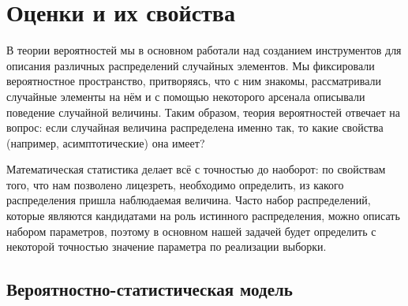 \section{Оценки и их свойства}

В теории вероятностей мы в основном работали над созданием инструментов для описания различных распределений случайных элементов. Мы фиксировали вероятностное пространство, притворяясь, что с ним знакомы, рассматривали случайные элементы на нём и с помощью некоторого арсенала описывали поведение случайной величины. Таким образом, теория вероятностей отвечает на вопрос: если случайная величина распределена именно так, то какие свойства (например, асимптотические) она имеет?

Математическая статистика делает всё с точностью до наоборот: по свойствам того, что нам позволено лицезреть, необходимо определить, из какого распределения пришла наблюдаемая величина. Часто набор распределений, которые являются кандидатами на роль истинного распределения, можно описать набором параметров, поэтому в основном нашей задачей будет определить с некоторой точностью значение параметра по реализации выборки.

\subsection{Вероятностно-статистическая модель}

